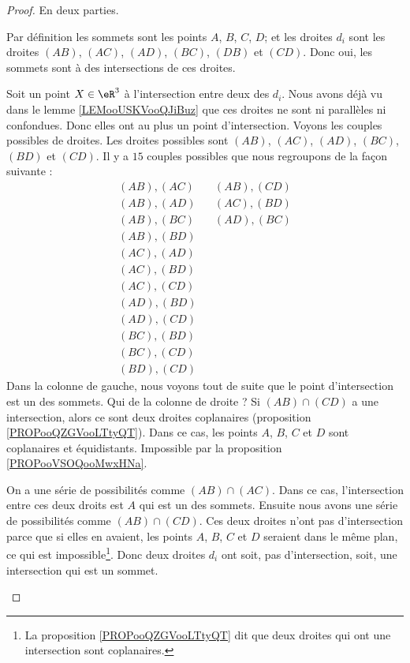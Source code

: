 \begin{proof}
	En deux parties.
	\begin{subproof}

		Par définition les sommets sont les points \( A \), \( B\), \( C\), \( D\); et les droites \( d_i\) sont les droites \( (AB)\), \( (AC)\), \( (AD)\), \( (BC)\), \( (DB)\) et \( (CD)\). Donc oui, les sommets sont à des intersections de ces droites.

		Soit un point \( X\in \eR^3\) à l'intersection entre deux des \( d_i\). Nous avons déjà vu dans le lemme \ref{LEMooUSKVooQJiBuz} que ces droites ne sont ni parallèles ni confondues. Donc elles ont au plus un point d'intersection. Voyons les couples possibles de droites. Les droites possibles sont \( (AB)\), \( (AC)\), \( (AD)\), \( (BC)\), \( (BD)\) et \( (CD)\). Il y a \( 15 \) couples possibles que nous regroupons de la façon suivante :
		\begin{subequations}
			\begin{align}
				(AB), (AC) &  & (AB), (CD) \\
				(AB), (AD) &  & (AC), (BD) \\
				(AB), (BC) &  & (AD), (BC) \\
				(AB), (BD) &  &            \\
				(AC), (AD) &  &            \\
				(AC), (BD) &  &            \\
				(AC), (CD) &  &            \\
				(AD), (BD) &  &            \\
				(AD), (CD) &  &            \\
				(BC), (BD) &  &            \\
				(BC), (CD) &  &            \\
				(BD), (CD) &  &
			\end{align}
		\end{subequations}
		Dans la colonne de gauche, nous voyons tout de suite que le point d'intersection est un des sommets. Qui de la colonne de droite ? Si \( (AB)\cap (CD)\) a une intersection, alors ce sont deux droites coplanaires (proposition \ref{PROPooQZGVooLTtyQT}). Dans ce cas, les points \( A\), \( B\), \( C\) et \( D\) sont coplanaires et équidistants. Impossible par la proposition \ref{PROPooVSOQooMwxHNa}.

		On a une série de possibilités comme \( (AB)\cap(AC)\). Dans ce cas, l'intersection entre ces deux droits est \( A\) qui est un des sommets. Ensuite nous avons une série de possibilités comme \( (AB)\cap (CD)\). Ces deux droites n'ont pas d'intersection parce que si elles en avaient, les points \( A\), \( B\), \( C\) et \( D\) seraient dans le même plan, ce qui est impossible\footnote{La proposition \ref{PROPooQZGVooLTtyQT} dit que deux droites qui ont une intersection sont coplanaires.}. Donc deux droites \( d_i\) ont soit, pas d'intersection, soit, une intersection qui est un sommet.
	\end{subproof}
\end{proof}


